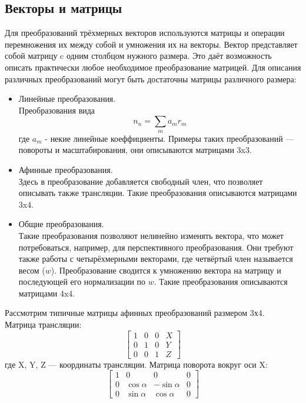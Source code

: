 \documentclass[a4paper,12pt]{report}
\numberwithin{equation}{section}
\begin{document}
\subsection{Векторы и матрицы} \label{matrix_section}
Для преобразований трёхмерных векторов используются матрицы и операции перемножения их между собой и умножения их на векторы. Вектор представляет собой матрицу c одним столбцом нужного размера. Это даёт возможность описать практически любое необходимое преобразование матрицей. Для описания различных преобразований могут быть достаточны матрицы различного размера:
\begin{itemize}
\item Линейные преобразования. \\
Преобразования вида
\begin{equation*}
n_n = \sum_{m} a_m r_m
\end{equation*}
где $a_m$ - некие линейные коеффициенты. Примеры таких преобразований --- повороты и масштабирования, они описываются матрицами 3x3.
\item Афинные преобразования. \\
Здесь в преобразование добавляется свободный член, что позволяет описывать также трансляции. Такие преобразования описываются матрицами 3x4.
\item Общие преобразования. \\
Такие преобразования позволяют нелинейно изменять вектора, что может потребоваться, например, для перспективного преобразования. Они требуют также работы с четырёхмерными векторами, где четвёртый член называется весом ($w$). Преобразование сводится к умножению вектора на матрицу и последующей его нормализации по $w$. Такие преобразования описываются матрицами 4x4.
\end{itemize}
Рассмотрим типичные матрицы афинных преобразований размером 3х4. \\
Матрица трансляции:
\begin{equation}
\begin{bmatrix}
1 & 0 & 0 & X \\
0 & 1 & 0 & Y \\
0 & 0 & 1 & Z
\end{bmatrix}
\end{equation}
где X, Y, Z --- координаты трансляции.
Матрица поворота вокруг оси X:
\begin{equation}
\begin{bmatrix}
1 & 0 & 0 & 0 \\
0 & \cos{\alpha} & -\sin{\alpha} & 0 \\
0 & \sin{\alpha} & \cos{\alpha} & 0
\end{bmatrix}
\end{equation}
\end{document}

